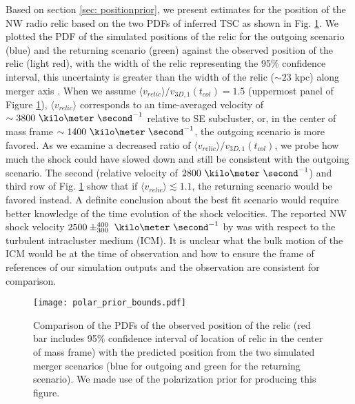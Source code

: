 Based on section \ref{sec: positionprior}, we
present estimates for the position of the NW radio relic based on the two PDFs
of inferred TSC as shown in Fig. \ref{fig: positionprior}. We plotted
the PDF of the simulated positions of the relic for the outgoing scenario
(blue) and the returning scenario (green) against
the observed position of the relic (light red), with the width of the
relic representing the 95\% confidence interval, this uncertainty is greater than the width of the relic ($\sim$$23$
kpc) along merger axis \citep{L13}. When we
assume $\langle v_{relic} \rangle / v_{3D, 1}(t_{col}) = 1.5$ (uppermost
panel of Figure \ref{fig: positionprior}), $\langle v_{relic} \rangle$
corresponds to an time-averaged velocity of $\sim3800~\kilo
\meter~\second^{-1}$ relative to SE subcluster, or, in the center of
mass frame $\sim1400~\kilo\meter~\second^{-1}$, the outgoing scenario 
is more favored.  As we examine a decreased ratio of  $\langle v_{relic} \rangle /
v_{3D,1}(t_{col})$, we probe how much the shock could have slowed down
and still be consistent with the outgoing scenario. The second (relative
velocity of $2800~\kilo\meter~\second^{-1}$) and third row of
Fig. \ref{fig: positionprior} show that if $\langle v_{relic} \rangle
\lesssim 1.1 $, the returning scenario would be favored instead. A definite conclusion about the best fit scenario would require better
knowledge of the time evolution of the shock velocities. 
The reported NW shock velocity $2500
\pm^{400}_{300}~\kilo\meter~\second^{-1}$ by \cite{L13} was with respect to
the turbulent intracluster medium (ICM). It is unclear what the bulk motion
of the ICM would be at the time of observation and how to ensure the frame of
references of our simulation outputs and the observation are consistent for
comparison.  





\begin{figure}
	\texttt{[image: polar\_prior\_bounds.pdf]}
	\caption{Comparison of the PDFs of the observed position of the relic (red bar
		includes 95\% confidence interval of location of relic in the center of
		mass frame) with the	predicted position from the two simulated merger scenarios (blue for
	outgoing and green for the returning scenario). We made use of the polarization prior for producing this figure. 
	\label{fig: positionprior}}
\end{figure}

